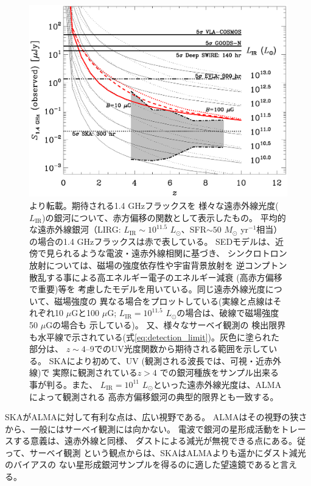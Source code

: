 \begin{figure}[tbp]
\begin{center}
\includegraphics[width=0.8\linewidth]{galaxy/murphy_f3.eps}
\end{center}
\vspace{-0.5cm}
\caption{\citet{2009ApJ...706..482M}より転載。期待される1.4 GHzフラックスを
様々な遠赤外線光度($L_\mathrm{IR}$)の銀河について、赤方偏移の関数として表示したもの。
%
平均的な遠赤外線銀河（LIRG: $L_\mathrm{IR}\sim10^{11.5}$ $L_\odot$、SFR$\sim50$ $M_\odot$ yr$^{-1}$相当）の場合の1.4 GHzフラックスは赤で表している。
%
SEDモデルは、近傍で見られるような電波・遠赤外線相関に基づき、
シンクロトロン放射については、磁場の強度依存性や宇宙背景放射を
逆コンプトン散乱する事による高エネルギー電子のエネルギー減衰
(高赤方偏移で重要)等を
考慮したモデルを用いている。同じ遠赤外線光度について、磁場強度の
異なる場合をプロットしている(実線と点線はそれぞれ10 $\mu$Gと100 $\mu$G;
$L_\mathrm{IR}=10^{11.5}$ $L_\odot$の場合は、破線で磁場強度50 $\mu$Gの場合も
示している)。
又、様々なサーベイ観測の
検出限界も水平線で示されている(式\ref{eq:detection_limit})。灰色に塗られた部分は、
$z\sim 4$--9でのUV光度関数から期待される範囲を示している。
SKAにより初めて、UV (観測される波長では、可視・近赤外線)で
実際に観測されている$z>4$
での銀河種族をサンプル出来る事が判る。また、
$L_\mathrm{IR}=10^{11}$ $L_\odot$といった遠赤外線光度は、ALMAによって観測される
高赤方偏移銀河の典型的限界とも一致する。}
\label{fig:murphy}
\end{figure}

SKAがALMAに対して有利な点は、広い視野である。
ALMAはその視野の狭さから、一般にはサーベイ観測には向かない。
電波で銀河の星形成活動をトレースする意義は、遠赤外線と同様、
ダストによる減光が無視できる点にある。従って、サーベイ観測
という観点からは、SKAはALMAよりも遥かにダスト減光のバイアスの
ない星形成銀河サンプルを得るのに適した望遠鏡であると言える。

